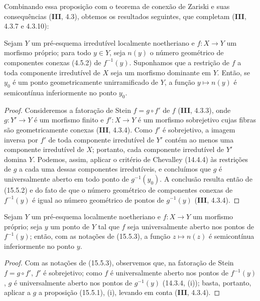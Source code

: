 Combinando essa proposição com o teorema de conexão de Zariski e suas consequências (\textbf{III}, 4.3), obtemos os resultados seguintes, que completam (\textbf{III}, 4.3.7 e 4.3.10):

\begin{proposition}[15.5.3]
\label{IV.15.5.3}
Sejam $Y$ um pré-esquema irredutível localmente noetheriano e $f:X\to Y$ um morfismo próprio; para todo $y\in Y$, seja $n(y)$ o número geométrico de componentes conexas (4.5.2) de $f^{-1}(y)$. Suponhamos que a restrição de $f$ a toda componente irredutível de $X$ seja um morfismo dominante em $Y$. Então, se $y_0$ é um ponto geometricamente unirramificado de $Y$, a função $y\mapsto n(y)$ é semicontínua inferiormente no ponto $y_0$.
\end{proposition}

\begin{proof}
Consideremos a fatoração de Stein $f=g\circ f'$ de $f$ (\textbf{III}, 4.3.3), onde $g:Y'\to Y$ é um morfismo finito e $f':X\to Y$ é um morfismo sobrejetivo cujas fibras são geometricamente conexas (\textbf{III}, 4.3.4). Como $f'$ é sobrejetivo, a imagem inversa por $f'$ de toda componente irredutível de $Y'$ contém ao menos uma componente irredutível de $X$; portanto, cada componente irredutível de $Y'$ domina $Y$. Podemos, assim, aplicar o critério de Chevalley (14.4.4) às restrições de $g$ a cada uma dessas componentes irredutíveis, e concluímos que $g$ é universalmente aberto em todo ponto de $g^{-1}(y_0)$. A conclusão resulta então de (15.5.2) e do fato de que o número geométrico de componentes conexas de $f^{-1}(y)$ é igual ao número geométrico de pontos de $g^{-1}(y)$ (\textbf{III}, 4.3.4).
\end{proof}

\begin{corollary}[15.5.4]
\label{IV.15.5.4}
Sejam $Y$ um pré-esquema localmente noetheriano e $f:X\to Y$ um morfismo próprio; seja $y$ um ponto de $Y$ tal que $f$ seja universalmente aberto nos pontos de $f^{-1}(y)$;
então, com as notações de (15.5.3), a função $z\mapsto n(z)$ é semicontínua inferiormente no ponto $y$.
\end{corollary}

\begin{proof}
Com as notações de (15.5.3), observemos que, na fatoração de Stein $f=g\circ f'$, $f'$ é sobrejetivo; como $f$ é universalmente aberto nos pontos de $f^{-1}(y)$, $g$ é universalmente aberto nos pontos de $g^{-1}(y)$ (14.3.4, (i)); basta, portanto, aplicar a $g$ a proposição (15.5.1), (i), levando em conta (\textbf{III}, 4.3.4).
\end{proof}

